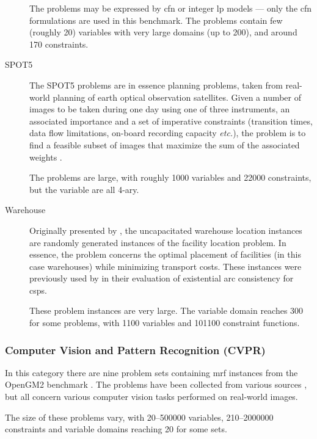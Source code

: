 \begin{description}
		The problems may be expressed by \gls{cfn} or integer \gls{lp} models — only the \gls{cfn} formulations are used in this benchmark. The problems contain few (roughly \num{20}) variables with very large domains (up to \num{200}), and around \num{170} constraints.

	\item[SPOT5]
		The SPOT5 problems are in essence planning problems, taken from real-world planning of earth optical observation satellites.
		Given a number of images to be taken during one day using one of three instruments, an associated importance and a set of imperative constraints (transition times, data flow limitations, on-board recording capacity \emph{etc.}), the problem is to find a feasible subset of images that maximize the sum of the associated weights \parencite{Bensana99}.

		The problems are large, with roughly \num{1000} variables and \num{22000} constraints, but the variable are all 4-ary.

	\item[Warehouse]
		Originally presented by \textcite{Kratica01}, the uncapacitated warehouse location instances are randomly generated instances of the facility location problem. In essence, the problem concerns the optimal placement of facilities (in this case warehouses) while minimizing transport costs. These instances were previously used by \textcite{deGivry05} in their evaluation of existential arc consistency for \glspl{csp}.

		These problem instances are very large. The variable domain reaches \num{300} for some problems, with \num{1100} variables and \num{101100} constraint functions.

\end{description}

\subsubsection{Computer Vision and Pattern Recognition (CVPR)}
In this category there are nine problem sets containing \gls{mrf} instances from the OpenGM2 benchmark \parencite{Kappes13}.
The problems have been collected from various sources \parencite[\pno~1330]{Kappes13}, but all concern various computer vision tasks performed on real-world images.

The size of these problems vary, with \numrange{20}{500000} variables, \numrange{210}{2000000} constraints and variable domains reaching \num{20} for some sets.

